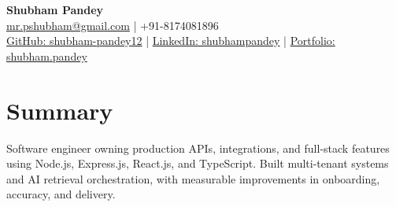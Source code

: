 \documentclass[a4paper,10pt]{article}
\begin{document}
\begin{center}
{\LARGE\textbf{Shubham Pandey}}\\[3pt]
\href{mailto:mr.pshubham@gmail.com}{mr.pshubham@gmail.com} | +91-8174081896\\[2pt]
\href{https://github.com/shubham-pandey12}{GitHub: shubham-pandey12} | \href{https://www.linkedin.com/in/shubham-pandey-a74716199/}{LinkedIn: shubhampandey} | \href{https://shubham-portfolio-mocha.vercel.app/}{Portfolio: shubham.pandey}
\end{center}
\section{Summary}
Software engineer owning production APIs, integrations, and full-stack features using Node.js, Express.js, React.js, and TypeScript. Built multi-tenant systems and AI retrieval orchestration, with measurable improvements in onboarding, accuracy, and delivery.
\end{document}
